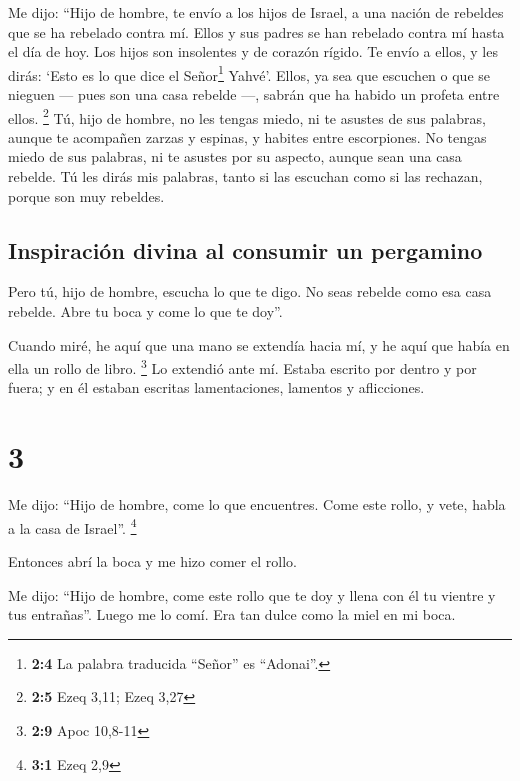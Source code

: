  Me dijo: ``Hijo de hombre, te envío a los hijos de
Israel, a una nación de rebeldes que se ha rebelado contra mí. Ellos y
sus padres se han rebelado contra mí hasta el día de hoy. 
Los hijos son insolentes y de corazón rígido. Te envío a ellos, y les
dirás: `Esto es lo que dice el Señor\footnote{\textbf{2:4} La palabra
  traducida ``Señor'' es ``Adonai''.} Yahvé'.  Ellos, ya
sea que escuchen o que se nieguen --- pues son una casa rebelde ---,
sabrán que ha habido un profeta entre ellos. \footnote{\textbf{2:5} Ezeq
  3,11; Ezeq 3,27}  Tú, hijo de hombre, no les tengas
miedo, ni te asustes de sus palabras, aunque te acompañen zarzas y
espinas, y habites entre escorpiones. No tengas miedo de sus palabras,
ni te asustes por su aspecto, aunque sean una casa rebelde.
 Tú les dirás mis palabras, tanto si las escuchan como si
las rechazan, porque son muy rebeldes.

\hypertarget{inspiraciuxf3n-divina-al-consumir-un-pergamino}{%
\subsection{Inspiración divina al consumir un
pergamino}\label{inspiraciuxf3n-divina-al-consumir-un-pergamino}}

 Pero tú, hijo de hombre, escucha lo que te digo. No seas
rebelde como esa casa rebelde. Abre tu boca y come lo que te doy''.

 Cuando miré, he aquí que una mano se extendía hacia mí, y
he aquí que había en ella un rollo de libro. \footnote{\textbf{2:9} Apoc
  10,8-11}  Lo extendió ante mí. Estaba escrito por
dentro y por fuera; y en él estaban escritas lamentaciones, lamentos y
aflicciones.

\hypertarget{section-2}{%
\section{3}\label{section-2}}

 Me dijo: ``Hijo de hombre, come lo que encuentres. Come
este rollo, y vete, habla a la casa de Israel''. \footnote{\textbf{3:1}
  Ezeq 2,9}

 Entonces abrí la boca y me hizo comer el rollo.

 Me dijo: ``Hijo de hombre, come este rollo que te doy y
llena con él tu vientre y tus entrañas''. Luego me lo comí. Era tan
dulce como la miel en mi boca.

